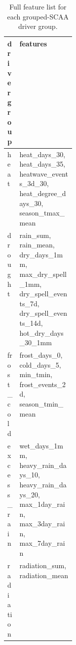 \begin{table}[H]
\centering
\caption{Full feature list for each grouped-SCAA driver group.}
\label{tab:driver_group_features}
\small
\renewcommand{\arraystretch}{1.15}
\begin{tabularx}{\linewidth}{@{}>{\raggedright\arraybackslash}p{0.16\linewidth}X@{}}
\toprule
driver group & features \\
\midrule
heat & heat\_days\_30, heat\_days\_35, heatwave\_events\_3d\_30, heat\_degree\_days\_30, season\_tmax\_mean \\
drought & rain\_sum, rain\_mean, dry\_days\_1mm, max\_dry\_spell\_1mm, dry\_spell\_events\_7d, dry\_spell\_events\_14d, hot\_dry\_days\_30\_1mm \\
frost\_cold & frost\_days\_0, cold\_days\_5, min\_tmin, frost\_events\_2d, season\_tmin\_mean \\
excess\_rain & wet\_days\_1mm, heavy\_rain\_days\_10, heavy\_rain\_days\_20, max\_1day\_rain, max\_3day\_rain, max\_7day\_rain \\
radiation & radiation\_sum, radiation\_mean \\
\bottomrule
\end{tabularx}
\end{table}
